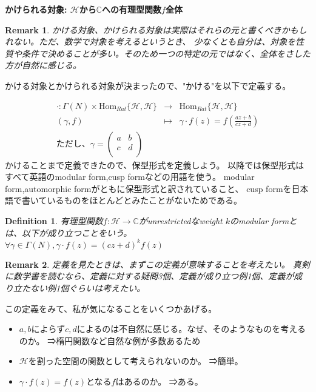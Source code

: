 \documentclass{ujarticle}
\newtheorem{dfn}[thm]{Definition}
\newtheorem*{rem}{Remark}
\begin{document}
\noindent \bf{かけられる対象:}
$\mathcal{H}$から$\mathbb{C}$への有理型関数$f$全体

\begin{rem}
  かける対象、かけられる対象は実際はそれらの元と書くべきかもしれない。ただ、数学で対象を考えるというとき、
  少なくとも自分は、対象を性質や条件で決めることが多い。そのため一つの特定の元ではなく、全体をさした方が自然に感じる。
\end{rem}

\noindent かける対象とかけられる対象が決まったので、"かける"を以下で定義する。

\begin{eqnarray*}
  \cdot :  \Gamma(N) \times \mathrm{Hom}_{Rat}\{\mathcal{H},\mathcal{H}\} & \to & \mathrm{Hom}_{Rat}\{\mathcal{H},\mathcal{H}\} \\
  (\gamma,f) &\mapsto &\gamma \cdot f(z) = f(\frac{az + b}{cz + d})　\\
\mbox{ただし、} \gamma =
\begin{pmatrix}
  a & b \\
  c & d \\
\end{pmatrix}
\end{eqnarray*}
かけることまで定義できたので、保型形式を定義しよう。
以降では保型形式はすべて英語のmodular form,cusp formなどの用語を使う。
modular form,automorphic formがともに保型形式と訳されていること、
cusp formを日本語で書いているものをほとんどとみたことがないためである。

\begin{dfn}
  有理型関数$f:\mathcal{H} \to \mathbb{C}$がunrestrictedなweight $k$のmodular formとは、以下が成り立つことをいう。 \\
  $\forall  \gamma \in \Gamma(N),  \gamma \cdot f(z) = (cz + d)^{k}f(z)$
\end{dfn}
\begin{rem}
  定義を見たときは、まずこの定義が意味することを考えたい。
  真剣に数学書を読むなら、定義に対する疑問3個、定義が成り立つ例1個、定義が成り立たない例1個ぐらいは考えたい。
\end{rem}
この定義をみて、私が気になることをいくつかあげる。
\begin{itemize}
  \setlength{\parskip}{0cm} %
  \setlength{\itemsep}{0cm} %
  \item $a,b$によらず$c,d$によるのは不自然に感じる。なぜ、そのようなものを考えるのか。
  ⇒楕円関数など自然な例が多数あるため
  \item $\mathcal{H}$を割った空間の関数として考えられないのか。
  ⇒簡単。
  \item $\gamma \cdot f (z) = f(z)$となる$f$はあるのか。
  ⇒ある。
\end{itemize}
\end{document}
